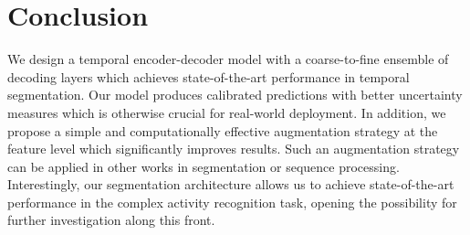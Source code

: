 \documentclass[10pt,twocolumn,letterpaper]{article}
\begin{document}
\section{Conclusion} We design a temporal encoder-decoder model with a coarse-to-fine ensemble of decoding layers which achieves state-of-the-art performance in temporal segmentation.  Our model produces calibrated predictions with better uncertainty measures which is otherwise crucial for real-world deployment.  In addition, we propose a simple and computationally effective augmentation strategy at the feature level which significantly improves results. Such an augmentation strategy can be applied in other works in segmentation or sequence processing. Interestingly, our segmentation architecture allows us to achieve state-of-the-art performance in the complex activity recognition task, opening the  possibility for further investigation along this front.



{\small


}
\end{document}
